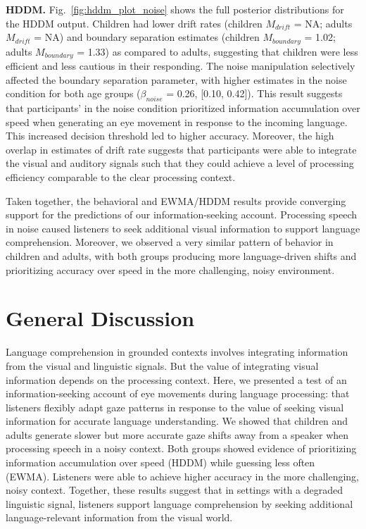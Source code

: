 \documentclass[english,man]{apa6}
\theoremstyle{definition}
\theoremstyle{definition}
\theoremstyle{definition}
\theoremstyle{remark}
\begin{document}
\textbf{HDDM.} Fig.~\ref{fig:hddm_plot_noise} shows the full posterior
distributions for the HDDM output. Children had lower drift rates
(children \(M_{drift}\) = NA; adults \(M_{drift}\) = NA) and boundary
separation estimates (children \(M_{boundary}\) = 1.02; adults
\(M_{boundary}\) = 1.33) as compared to adults, suggesting that children
were less efficient and less cautious in their responding. The noise
manipulation selectively affected the boundary separation parameter,
with higher estimates in the noise condition for both age groups
(\(\beta_{noise}\) = 0.26, {[}0.10, 0.42{]}). This result suggests that
participants' in the noise condition prioritized information
accumulation over speed when generating an eye movement in response to
the incoming language. This increased decision threshold led to higher
accuracy. Moreover, the high overlap in estimates of drift rate suggests
that participants were able to integrate the visual and auditory signals
such that they could achieve a level of processing efficiency comparable
to the clear processing context.

Taken together, the behavioral and EWMA/HDDM results provide converging
support for the predictions of our information-seeking account.
Processing speech in noise caused listeners to seek additional visual
information to support language comprehension. Moreover, we observed a
very similar pattern of behavior in children and adults, with both
groups producing more language-driven shifts and prioritizing accuracy
over speed in the more challenging, noisy environment.

\hypertarget{general-discussion}{%
\section{General Discussion}\label{general-discussion}}

Language comprehension in grounded contexts involves integrating
information from the visual and linguistic signals. But the value of
integrating visual information depends on the processing context. Here,
we presented a test of an information-seeking account of eye movements
during language processing: that listeners flexibly adapt gaze patterns
in response to the value of seeking visual information for accurate
language understanding. We showed that children and adults generate
slower but more accurate gaze shifts away from a speaker when processing
speech in a noisy context. Both groups showed evidence of prioritizing
information accumulation over speed (HDDM) while guessing less often
(EWMA). Listeners were able to achieve higher accuracy in the more
challenging, noisy context. Together, these results suggest that in
settings with a degraded linguistic signal, listeners support language
comprehension by seeking additional language-relevant information from
the visual world.
\end{document}

